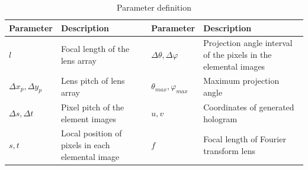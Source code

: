 \documentclass[10pt,letterpaper]{article}
\begin{document}
\begin{table}[ht!]
\centering\caption{Parameter definition}
\begin{tabular}{lp{1.7in}|lp{1.7in}} 
\hline 
Parameter                & Description         & Parameter      & Description \\ \hline 
$l$                      & Focal length of the lens array       & $\Delta\theta, \Delta\varphi$ & Projection angle interval of the pixels in the elemental images \\ \hline 
$\Delta x_p, \Delta y_p$ & Lens pitch of lens array & $\theta_{max}, \varphi_{max}$ & Maximum projection angle \\ \hline 
$\Delta s, \Delta t$     & Pixel pitch of the element images & $u, v$ & Coordinates of generated hologram \\ \hline 
$s, t$                     & Local position of pixels in each elemental image & $f$ & Focal length of Fourier transform lens \\ \hline 
\end{tabular}
\label{tb_param}
\end{table}
\end{document}
